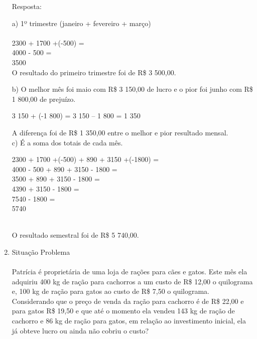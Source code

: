 \documentclass[a4paper,14pt]{article}
\begin{document}
\begin{multicols}{2}
\begin{enumerate}
			 \selectfont
			
			Resposta:
			
			a) 1º trimestre (janeiro + fevereiro + março) \\\\
			2300 + 1700 +(-500) = \\
			4000 - 500 = \\
			3500 \\
			
			O resultado do primeiro trimestre foi de R\$ 3 500,00.
			
			b) O melhor mês foi maio com R\$ 3 150,00 de lucro e o pior foi junho com R\$ 1 800,00 de prejuízo. \\
			
			\fontsize{10}{\baselineskip} \selectfont
			
			3 150 + (-1 800) = 3 150 – 1 800 = 1 350 \\
			
			\fontsize{12}{\baselineskip} \selectfont
			
			A diferença foi de R\$ 1 350,00 entre o melhor e pior resultado mensal.\\
			
			c) É a soma dos totais de cada mês. \\
			\fontsize{10}{\baselineskip} \selectfont
			
			2300 + 1700 +(-500) + 890 + 3150 +(-1800) = \\
			4000 - 500 + 890 + 3150 - 1800 = \\
			3500 + 890 + 3150 - 1800 = \\
			4390 + 3150 - 1800 = \\
			7540 - 1800 = \\
			5740 \\\\
			
			\fontsize{14}{\baselineskip} \selectfont
			
			O resultado semestral foi de R\$ 5 740,00.
			
			 \selectfont
			
			\item Situação Problema \\\\
			Patrícia é proprietária de uma loja de rações para cães e gatos. Este mês ela adquiriu 400 kg de ração para cachorros a um custo de R\$ 12,00 o quilograma e, 100 kg de ração para gatos ao custo de R\$ 7,50 o quilograma. Considerando que o preço de venda da ração para cachorro é de R\$ 22,00 e para gatos R\$ 19,50 e que até o momento ela vendeu 143 kg de ração de cachorro e 86 kg de ração para gatos, em relação ao investimento inicial, ela já obteve lucro ou ainda não cobriu o custo? \\
			

\end{enumerate}
\end{multicols}
\end{document}
